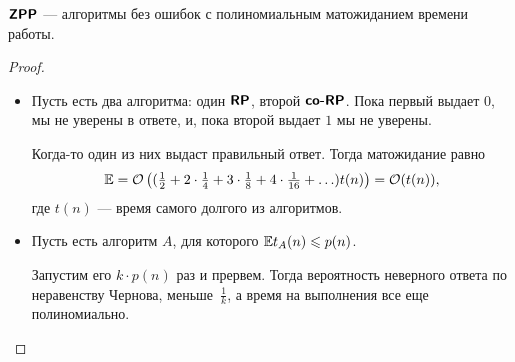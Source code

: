 \begin{defn}\index{\ZPP}
	$ \textmd{\textbf{\textsf{ZPP}}}$ --- алгоритмы без ошибок с полиномиальным матожиданием времени работы.
\end{defn}
\begin{proof}
	\begin{itemize}
		\item
			Пусть есть два алгоритма: один $ \textmd{\textbf{\textsf{RP}}}$, второй $ \textmd{\textbf{\textsf{co-RP}}}$. Пока первый выдает  $ 0$, мы не уверены в ответе, и, пока второй выдает $ 1$ мы не уверены.

			Когда-то один из них выдаст правильный ответ.
			Тогда матожидание равно
			\[
				\mathbb{E} = \mathcal{O}\left( (\tfrac{1}{2} + 2\cdot \tfrac{1}{4}+ 3\cdot \tfrac{1}{8} + 4\cdot \tfrac{1}{16} + \ldots ) t(n)\right)  = \mathcal{O}(t(n))
			,\]
			где $ t(n)$ --- время самого долгого из алгоритмов.
		\item Пусть есть алгоритм $A $, для которого $ \mathbb{E} t_{A}(n) \leqslant p(n)$.

			Запустим его  $ k \cdot  p(n)$ раз и прервем.
			Тогда вероятность неверного ответа по неравенству Чернова, меньше~$ \frac{1}{k}$, а время на выполнения все еще полиномиально.
	\end{itemize}
\end{proof}

